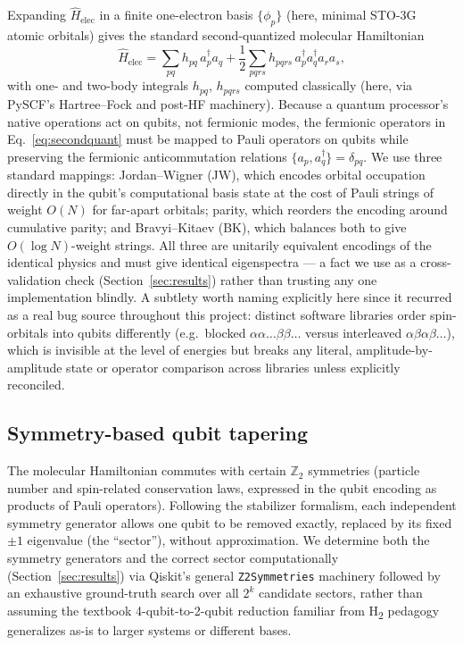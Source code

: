 \documentclass[11pt]{article}
\begin{document}
Expanding $\hat{H}_{\text{elec}}$ in a finite one-electron basis
$\{\phi_p\}$ (here, minimal STO-3G atomic orbitals) gives the standard
second-quantized molecular Hamiltonian
\begin{equation}
  \hat{H}_{\text{elec}} = \sum_{pq} h_{pq}\, a_p^\dagger a_q
  + \frac{1}{2}\sum_{pqrs} h_{pqrs}\, a_p^\dagger a_q^\dagger a_r a_s,
  \label{eq:secondquant}
\end{equation}
with one- and two-body integrals $h_{pq}$, $h_{pqrs}$ computed classically
(here, via PySCF's Hartree--Fock and post-HF machinery). Because a quantum
processor's native operations act on qubits, not fermionic modes, the
fermionic operators in Eq.~\eqref{eq:secondquant} must be mapped to Pauli
operators on qubits while preserving the fermionic anticommutation relations
$\{a_p, a_q^\dagger\} = \delta_{pq}$. We use three standard mappings:
Jordan--Wigner (JW), which encodes orbital occupation directly in the qubit's
computational basis state at the cost of Pauli strings of weight
$O(N)$ for far-apart orbitals; parity, which reorders the encoding around
cumulative parity; and Bravyi--Kitaev (BK), which balances both to give
$O(\log N)$-weight strings. All three are unitarily equivalent encodings of
the identical physics and must give identical eigenspectra --- a fact we use
as a cross-validation check (Section~\ref{sec:results}) rather than trusting
any one implementation blindly. A subtlety worth naming explicitly here since
it recurred as a real bug source throughout this project: distinct software
libraries order spin-orbitals into qubits differently (e.g.\ blocked
$\alpha\alpha\ldots\beta\beta\ldots$ versus interleaved
$\alpha\beta\alpha\beta\ldots$), which is invisible at the level of energies
but breaks any literal, amplitude-by-amplitude state or operator comparison
across libraries unless explicitly reconciled.

\subsection{Symmetry-based qubit tapering}

The molecular Hamiltonian commutes with certain $\mathbb{Z}_2$ symmetries
(particle number and spin-related conservation laws, expressed in the qubit
encoding as products of Pauli operators). Following the stabilizer formalism,
each independent symmetry generator allows one qubit to be removed exactly,
replaced by its fixed $\pm 1$ eigenvalue (the ``sector''), without approximation.
We determine both the symmetry generators and the correct sector
computationally (Section~\ref{sec:results}) via Qiskit's general
\texttt{Z2Symmetries} machinery followed by an exhaustive ground-truth search
over all $2^k$ candidate sectors, rather than assuming the textbook
4-qubit-to-2-qubit reduction familiar from H\textsubscript{2} pedagogy
generalizes as-is to larger systems or different bases.
\end{document}
